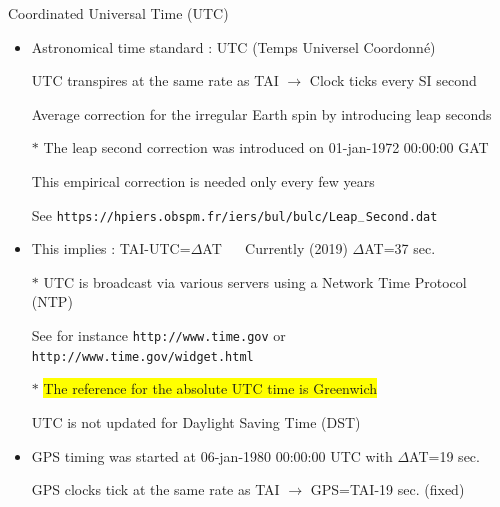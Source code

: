 \Tr
\begin{center}
{\red Coordinated Universal Time (UTC)}
\end{center}
%
\begin{itemize}
\item Astronomical time standard : {\blue UTC (Temps Universel Coordonn\'{e})}
\item[] UTC transpires at the same rate as TAI $\rightarrow$ Clock ticks every SI second
\item[] Average correction for the irregular Earth spin by introducing {\blue leap seconds}
\item[$\ast$] The leap second correction was introduced on 01-jan-1972 00:00:00 GAT
\item[] This empirical correction is needed only every few years
\item[] See {\tt https://hpiers.obspm.fr/iers/bul/bulc/Leap}$_{-}${\tt Second.dat}
\item This implies : {\blue TAI-UTC=$\Delta$AT} $\quad$ Currently (2019) $\Delta$AT=37 sec. 
\item[$\ast$] UTC is broadcast via various servers using a Network Time Protocol (NTP)
\item[] See for instance {\tt http://www.time.gov} or {\tt http://www.time.gov/widget.html}
\item[$\ast$] \colorbox{yellow}{The reference for the absolute UTC time is Greenwich}
\item[] UTC is not updated for Daylight Saving Time (DST)
\item GPS timing was started at 06-jan-1980 00:00:00 UTC with $\Delta$AT=19 sec.
\item[] GPS clocks tick at the same rate as TAI $\rightarrow$ {\blue GPS=TAI-19 sec.} (fixed)
\end{itemize}


